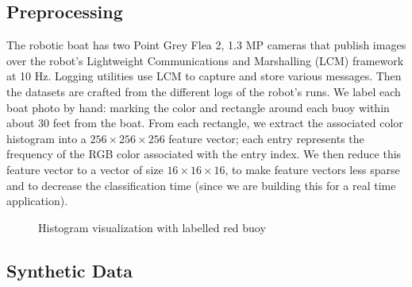 \documentclass{article} %
\begin{document}
\subsection{Preprocessing}
The robotic boat has two Point Grey Flea 2, 1.3 MP %
cameras that publish images over the robot's Lightweight 
Communications and Marshalling (LCM) framework at 10 Hz. Logging utilities use LCM to capture and store various messages. Then the datasets are crafted from the different logs of the robot's runs. We label each boat photo by hand: marking the color and rectangle around each buoy within about 30 feet from the boat. From each rectangle, we extract the associated color histogram into a $256 \times 256 \times 256$ feature vector; each entry represents the frequency of the RGB color associated with the entry index. We then reduce this feature vector to a vector of size $16 \times 16 \times 16$, to make feature vectors less sparse and to decrease the classification time (since we are building this for a real time application).

\begin{figure}[h]
\begin{center}
\end{center}
\caption{Histogram visualization with labelled red buoy}
\end{figure}

\subsection{Synthetic Data}
\end{document}
